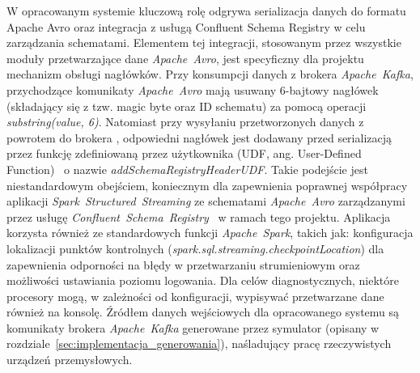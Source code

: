 \begin{enumerate}
W opracowanym systemie kluczową rolę odgrywa serializacja danych do formatu Apache Avro oraz integracja z usługą Confluent Schema Registry w celu zarządzania schematami. Elementem tej integracji, stosowanym przez wszystkie moduły przetwarzające dane \mbox{\textit{Apache Avro}}, jest specyficzny dla projektu mechanizm obsługi nagłówków. Przy konsumpcji danych z brokera \mbox{\textit{{Apache Kafka}}}, przychodzące komunikaty \mbox{\textit{Apache Avro}} mają usuwany 6-bajtowy nagłówek (składający się z tzw. magic byte oraz ID schematu) za pomocą operacji \textit{substring(value, 6)}. Natomiast przy wysyłaniu przetworzonych danych z powrotem do brokera \mbox{}, odpowiedni nagłówek jest dodawany przed serializacją przez funkcję zdefiniowaną przez użytkownika (UDF, ang. User-Defined Function)~\cite{spark_udf} o nazwie \textit{addSchemaRegistryHeaderUDF}. Takie podejście jest niestandardowym obejściem, koniecznym dla zapewnienia poprawnej współpracy aplikacji \mbox{\textit{Spark Structured Streaming}} ze schematami \mbox{\textit{Apache Avro}} zarządzanymi przez usługę \mbox{\textit{Confluent Schema Registry}}~\cite{confluent_schema_registry} w ramach tego projektu. Aplikacja korzysta również ze standardowych funkcji \mbox{\textit{Apache Spark}}, takich jak: konfiguracja lokalizacji punktów kontrolnych (\textit{spark.sql.streaming.checkpointLocation}) dla zapewnienia odporności na błędy w przetwarzaniu strumieniowym oraz możliwości ustawiania poziomu logowania. Dla celów diagnostycznych, niektóre procesory mogą, w zależności od konfiguracji, wypisywać przetwarzane dane również na konsolę. Źródłem danych wejściowych dla opracowanego systemu są komunikaty brokera \mbox{\textit{Apache Kafka}} generowane przez symulator (opisany w rozdziale~\ref{sec:implementacja_generowania}), naśladujący pracę rzeczywistych urządzeń przemysłowych.

\end{enumerate}